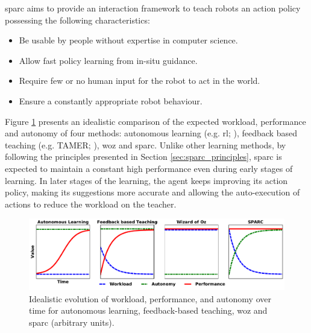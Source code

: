 \gls{sparc} aims to provide an interaction framework to teach robots an action policy possessing the following characteristics:
\begin{itemize}
	\item Be usable by people without expertise in computer science.
	\item Allow fast policy learning from in-situ guidance.
	\item Require few or no human input for the robot to act in the world.
	\item Ensure a constantly appropriate robot behaviour.
\end{itemize}

Figure \ref{fig:concept} presents an idealistic comparison of the expected workload, performance and autonomy of four methods: autonomous learning (e.g. \gls{rl}; \citealt{sutton1998reinforcement}), feedback based teaching (e.g. TAMER; \citealt{knox2009interactively}), \gls{woz} \citep{riek2012wizard} and \gls{sparc}. Unlike other learning methods, by following the principles presented in Section \ref{sec:sparc_principles}, \gls{sparc} is expected to maintain a constant high performance even during early stages of learning. In later stages of the learning, the agent keeps improving its action policy, making its suggestions more accurate and allowing the auto-execution of actions to reduce the workload on the teacher.

\begin{figure}[ht]
	\includegraphics[width=1\linewidth]{concept.pdf}
	\centering
	\caption{Idealistic evolution of workload, performance, and autonomy over time for autonomous learning, feedback-based teaching, \gls{woz} and \gls{sparc} (arbitrary units).}
	\label{fig:concept}
\end{figure}

